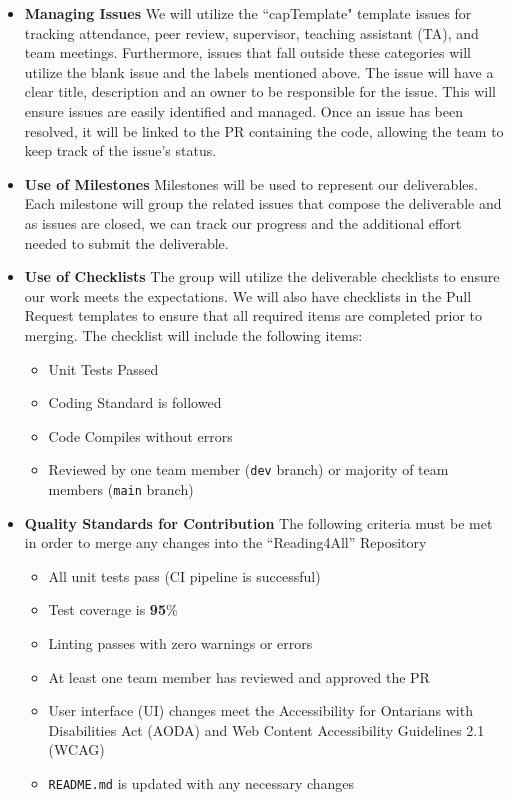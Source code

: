 \documentclass{article}
\begin{document}
\begin{itemize}
   \item \textbf{Managing Issues}\newline
  We will utilize the ``capTemplate" template issues for tracking attendance, peer review, supervisor, teaching assistant (TA), and team meetings. Furthermore, issues that fall outside these categories will utilize the blank issue and the labels mentioned above. \newline
  The issue will have a clear title, description and an owner to be responsible for the issue. This will ensure issues are easily identified and managed. Once an issue has been resolved, it will be linked to the PR containing the code, allowing the team to keep track of the issue's status.  
  \item \textbf{Use of Milestones}\newline
  Milestones will be used to represent our deliverables. Each milestone will group the related issues that compose the deliverable and as issues are closed, we can track our progress and the additional effort needed to submit the deliverable.
  \item \textbf{Use of Checklists} \newline
  The group will utilize the deliverable checklists to ensure our work meets the expectations. 
  We will also have checklists in the Pull Request templates to ensure that all required items are completed prior to merging. The checklist will include the following items: 
  \begin{itemize}
    \item Unit Tests Passed
    \item Coding Standard is followed 
    \item Code Compiles without errors
    \item Reviewed by one team member (\texttt{dev} branch) or majority of team members (\texttt{main} branch)
  \end{itemize}
  \item \textbf{Quality Standards for Contribution}\newline
  The following criteria must be met in order to merge any changes into the ``Reading4All'' Repository
  \begin{itemize}
    \item All unit tests pass (CI pipeline is successful)
    \item Test coverage is \textbf{95}\%
    \item Linting passes with zero warnings or errors
    \item At least one team member has reviewed and approved the PR
    \item User interface (UI) changes meet the Accessibility for Ontarians with Disabilities Act (AODA) and Web Content Accessibility Guidelines 2.1 (WCAG)
    \item \texttt{README.md} is updated with any necessary changes
  \end{itemize}
  
  \end{itemize}
\end{document}
